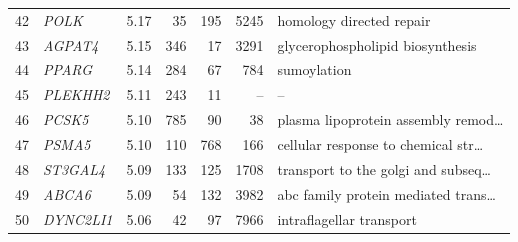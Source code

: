 \begin{table}[!t]
{\begin{tabular}{rlrrrrl}
42 & \textit{POLK} & 5.17 & 35 & 195 & 5245 & homology directed repair \\
43 & \textit{AGPAT4} & 5.15 & 346 & 17 & 3291 & glycerophospholipid biosynthesis \\
44 & \textit{PPARG} & 5.14 & 284 & 67 & 784 & sumoylation \\
45 & \textit{PLEKHH2} & 5.11 & 243 & 11 & -- & -- \\
46 & \textit{PCSK5} & 5.10 & 785 & 90 & 38 & plasma lipoprotein assembly remod\ldots \\
47 & \textit{PSMA5} & 5.10 & 110 & 768 & 166 & cellular response to chemical str\ldots \\
48 & \textit{ST3GAL4} & 5.09 & 133 & 125 & 1708 & transport to the golgi and subseq\ldots \\
49 & \textit{ABCA6} & 5.09 & 54 & 132 & 3982 & abc family protein mediated trans\ldots \\
50 & \textit{DYNC2LI1} & 5.06 & 42 & 97 & 7966 & intraflagellar transport \\
\hline
\end{tabular}}
\end{table}
